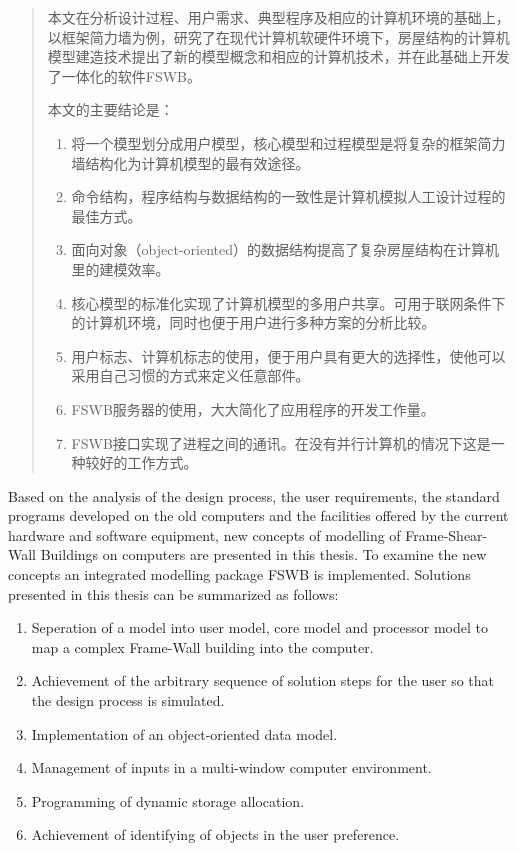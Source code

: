 \documentclass[degree=postdoc]{sysuthesis}
\begin{document}
\START
\showoutput

\frontmatter

\begin{abstract}
  本文在分析设计过程、用户需求、典型程序及相应的计算机环境的基础上，以框架简力墙为例，研究了在现代计算机软硬件环境下，房屋结构的计算机模型建造技术提出了新的模型概念和相应的计算机技术，并在此基础上开发了一体化的软件FSWB。

  本文的主要结论是：
  \begin{enumerate}
    \item 将一个模型划分成用户模型，核心模型和过程模型是将复杂的框架简力墙结构化为计算机模型的最有效途径。
    \item 命令结构，程序结构与数据结构的一致性是计算机模拟人工设计过程的最佳方式。
    \item 面向对象（object-oriented）的数据结构提高了复杂房屋结构在计算机里的建模效率。
    \item 核心模型的标准化实现了计算机模型的多用户共享。可用于联网条件下的计算机环境，同时也便于用户进行多种方案的分析比较。
    \item 用户标志、计算机标志的使用，便于用户具有更大的选择性，使他可以采用自己习惯的方式来定义任意部件。
    \item FSWB服务器的使用，大大简化了应用程序的开发工作量。
    \item FSWB接口实现了进程之间的通讯。在没有并行计算机的情况下这是一种较好的工作方式。
  \end{enumerate}

\end{abstract}

\begin{abstract*}
  Based on the analysis of the design process, the user requirements, the standard programs developed on the old computers and the facilities offered by the current hardware and software equipment, new concepts of modelling of Frame-Shear-Wall Buildings on computers are presented in this thesis.
  To examine the new concepts an integrated modelling package FSWB is implemented.
  Solutions presented in this thesis can be summarized as follows:
  \begin{enumerate}
    \item Seperation of a model into user model, core model and processor model to map a complex Frame-Wall building into the computer.
    \item Achievement of the arbitrary sequence of solution steps for the user so that the design process is simulated.
    \item Implementation of an object-oriented data model.
    \item Management of inputs in a multi-window computer environment.
    \item Programming of dynamic storage allocation.
    \item Achievement of identifying of objects in the user preference.
  \end{enumerate}

\end{abstract*}
\end{document}
